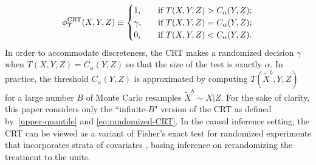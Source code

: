 \documentclass[12pt]{article}
\theoremstyle{definition}
\theoremstyle{remark}
\newcommand{\srx}{X}
\newcommand{\srz}{Z}
\newcommand{\srxk}{\widetilde X}
\newcommand{\sry}{Y}
\def\CRT{\textnormal{CRT}}
\begin{document}
\begin{equation}
	\label{eq:randomized-CRT}
	\phi^{\CRT}_T(\srx,\sry,\srz) \equiv 
	\begin{cases}
		1, \quad &\text{if }  T(\srx, \sry, \srz) > C_\alpha(\sry,\srz); \\
		\gamma, \quad &\text{if }  T(\srx, \sry, \srz) = C_\alpha(\sry,\srz); \\
		0, \quad &\text{if }T(\srx, \sry, \srz) < C_\alpha(\sry,\srz).
	\end{cases}
\end{equation}
In order to accommodate discreteness, the CRT makes a randomized decision $\gamma$ when $T(\srx, \sry, \srz) = C_\alpha(\sry,\srz)$ so that the size of the test is exactly $\alpha$.
In practice, the threshold $C_\alpha(\sry,\srz)$ is approximated by computing $T(\srxk^b, \sry, \srz)$ for a large number $B$ of Monte Carlo resamples $\srxk^b \sim \srx|\srz$. %
For the sake of clarity, this paper considers only the ``infinite-$B$" version of the CRT as defined by~\eqref{upper-quantile} and \eqref{eq:randomized-CRT}. In the causal inference setting, the CRT can be viewed as a variant of Fisher's exact test for randomized experiments that incorporates strata of covariates \cite{Zheng2008,Hennessy2016}, basing inference on rerandomizing the treatment to the units. 
\end{document}
